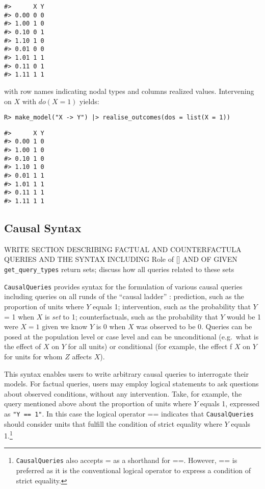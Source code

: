 \documentclass[
  11pt,
  article]{jss}
\begin{document}
\begin{verbatim}
#>      X Y
#> 0.00 0 0
#> 1.00 1 0
#> 0.10 0 1
#> 1.10 1 0
#> 0.01 0 0
#> 1.01 1 1
#> 0.11 0 1
#> 1.11 1 1
\end{verbatim}

with row names indicating nodal types and columns realized values.
Intervening on \(X\) with \(do(X=1)\) yields:

\begin{verbatim}
R> make_model("X -> Y") |> realise_outcomes(dos = list(X = 1))
\end{verbatim}

\begin{verbatim}
#>      X Y
#> 0.00 1 0
#> 1.00 1 0
#> 0.10 1 0
#> 1.10 1 0
#> 0.01 1 1
#> 1.01 1 1
#> 0.11 1 1
#> 1.11 1 1
\end{verbatim}

\hypertarget{sec-syntax}{%
\subsection{Causal Syntax}\label{sec-syntax}}

WRITE SECTION DESCRIBING FACTUAL AND COUNTERFACTULA QUERIES AND THE
SYNTAX INCLUDING Role of {[}{]} AND OF GIVEN \texttt{get\_query\_types}
return sets; discuss how all queries related to these sets

\texttt{CausalQueries} provides syntax for the formulation of various
causal queries including queries on all runds of the ``causal ladder''
\citep{pearl2018book}: prediction, such as the proportion of units where
\(Y\) equals 1; intervention, such as the probability that \(Y\) = 1
when \(X\) is \emph{set} to 1; counterfactuals, such as the probability
that \(Y\) would be 1 were \(X=1\) given we know \(Y\) is 0 when \(X\)
was observed to be 0. Queries can be posed at the population level or
case level and can be unconditional (e.g.~what is the effect of \(X\) on
\(Y\) for all units) or conditional (for example, the effect f \(X\) on
\(Y\) for units for whom \(Z\) affects \(X\)).

This syntax enables users to write arbitrary causal queries to
interrogate their models. For factual queries, users may employ logical
statements to ask questions about observed conditions, without any
intervention. Take, for example, the query mentioned above about the
proportion of units where \(Y\) equals 1, expressed as
\texttt{"Y\ ==\ 1"}. In this case the logical operator == indicates that
\texttt{CausalQueries} should consider units that fulfill the condition
of strict equality where \(Y\) equals 1.\footnote{\texttt{CausalQueries}
  also accepts = as a shorthand for ==. However, == is preferred as it
  is the conventional logical operator to express a condition of strict
  equality.}
\end{document}
